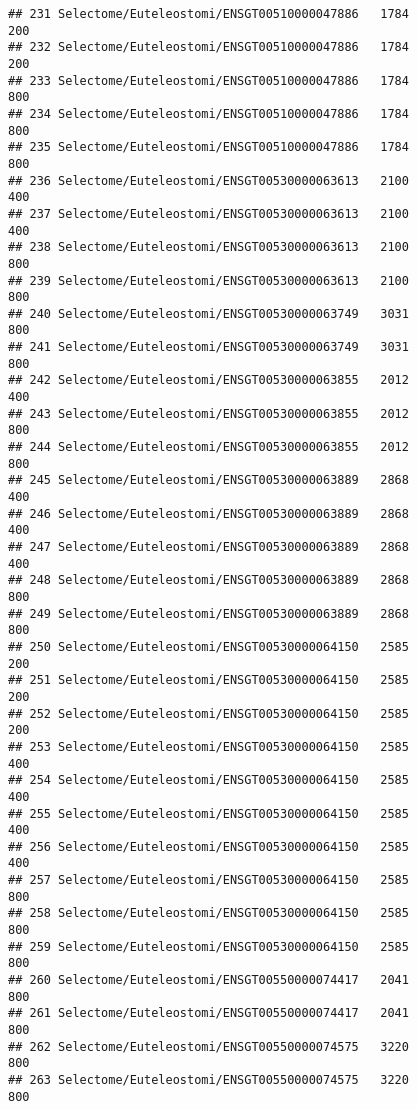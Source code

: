 \documentclass[
]{article}
\begin{document}
\begin{verbatim}
## 231 Selectome/Euteleostomi/ENSGT00510000047886   1784                   200
## 232 Selectome/Euteleostomi/ENSGT00510000047886   1784                   200
## 233 Selectome/Euteleostomi/ENSGT00510000047886   1784                   800
## 234 Selectome/Euteleostomi/ENSGT00510000047886   1784                   800
## 235 Selectome/Euteleostomi/ENSGT00510000047886   1784                   800
## 236 Selectome/Euteleostomi/ENSGT00530000063613   2100                   400
## 237 Selectome/Euteleostomi/ENSGT00530000063613   2100                   400
## 238 Selectome/Euteleostomi/ENSGT00530000063613   2100                   800
## 239 Selectome/Euteleostomi/ENSGT00530000063613   2100                   800
## 240 Selectome/Euteleostomi/ENSGT00530000063749   3031                   800
## 241 Selectome/Euteleostomi/ENSGT00530000063749   3031                   800
## 242 Selectome/Euteleostomi/ENSGT00530000063855   2012                   400
## 243 Selectome/Euteleostomi/ENSGT00530000063855   2012                   800
## 244 Selectome/Euteleostomi/ENSGT00530000063855   2012                   800
## 245 Selectome/Euteleostomi/ENSGT00530000063889   2868                   400
## 246 Selectome/Euteleostomi/ENSGT00530000063889   2868                   400
## 247 Selectome/Euteleostomi/ENSGT00530000063889   2868                   400
## 248 Selectome/Euteleostomi/ENSGT00530000063889   2868                   800
## 249 Selectome/Euteleostomi/ENSGT00530000063889   2868                   800
## 250 Selectome/Euteleostomi/ENSGT00530000064150   2585                   200
## 251 Selectome/Euteleostomi/ENSGT00530000064150   2585                   200
## 252 Selectome/Euteleostomi/ENSGT00530000064150   2585                   200
## 253 Selectome/Euteleostomi/ENSGT00530000064150   2585                   400
## 254 Selectome/Euteleostomi/ENSGT00530000064150   2585                   400
## 255 Selectome/Euteleostomi/ENSGT00530000064150   2585                   400
## 256 Selectome/Euteleostomi/ENSGT00530000064150   2585                   400
## 257 Selectome/Euteleostomi/ENSGT00530000064150   2585                   800
## 258 Selectome/Euteleostomi/ENSGT00530000064150   2585                   800
## 259 Selectome/Euteleostomi/ENSGT00530000064150   2585                   800
## 260 Selectome/Euteleostomi/ENSGT00550000074417   2041                   800
## 261 Selectome/Euteleostomi/ENSGT00550000074417   2041                   800
## 262 Selectome/Euteleostomi/ENSGT00550000074575   3220                   800
## 263 Selectome/Euteleostomi/ENSGT00550000074575   3220                   800

\end{verbatim}
\end{document}
